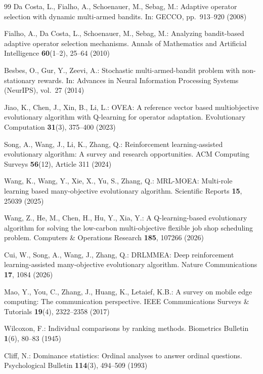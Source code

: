 \documentclass[runningheads]{llncs}
\begin{document}
\begin{thebibliography}{99}
Da Costa, L., Fialho, A., Schoenauer, M., Sebag, M.: Adaptive operator selection with dynamic multi-armed bandits. In: GECCO, pp.~913--920 (2008)

Fialho, A., Da Costa, L., Schoenauer, M., Sebag, M.: Analyzing bandit-based adaptive operator selection mechanisms. Annals of Mathematics and Artificial Intelligence \textbf{60}(1--2), 25--64 (2010)

Besbes, O., Gur, Y., Zeevi, A.: Stochastic multi-armed-bandit problem with non-stationary rewards. In: Advances in Neural Information Processing Systems (NeurIPS), vol.~27 (2014)

Jiao, K., Chen, J., Xin, B., Li, L.: OVEA: A reference vector based multiobjective evolutionary algorithm with Q-learning for operator adaptation. Evolutionary Computation \textbf{31}(3), 375--400 (2023)

Song, A., Wang, J., Li, K., Zhang, Q.: Reinforcement learning-assisted evolutionary algorithm: A survey and research opportunities. ACM Computing Surveys \textbf{56}(12), Article 311 (2024)

Wang, K., Wang, Y., Xie, X., Yu, S., Zhang, Q.: MRL-MOEA: Multi-role learning based many-objective evolutionary algorithm. Scientific Reports \textbf{15}, 25039 (2025)

Wang, Z., He, M., Chen, H., Hu, Y., Xia, Y.: A Q-learning-based evolutionary algorithm for solving the low-carbon multi-objective flexible job shop scheduling problem. Computers \& Operations Research \textbf{185}, 107266 (2026)

Cui, W., Song, A., Wang, J., Zhang, Q.: DRLMMEA: Deep reinforcement learning-assisted many-objective evolutionary algorithm. Nature Communications \textbf{17}, 1084 (2026)

Mao, Y., You, C., Zhang, J., Huang, K., Letaief, K.B.: A survey on mobile edge computing: The communication perspective. IEEE Communications Surveys \& Tutorials \textbf{19}(4), 2322--2358 (2017)

Wilcoxon, F.: Individual comparisons by ranking methods. Biometrics Bulletin \textbf{1}(6), 80--83 (1945)

Cliff, N.: Dominance statistics: Ordinal analyses to answer ordinal questions. Psychological Bulletin \textbf{114}(3), 494--509 (1993)


\end{thebibliography}
\end{document}
